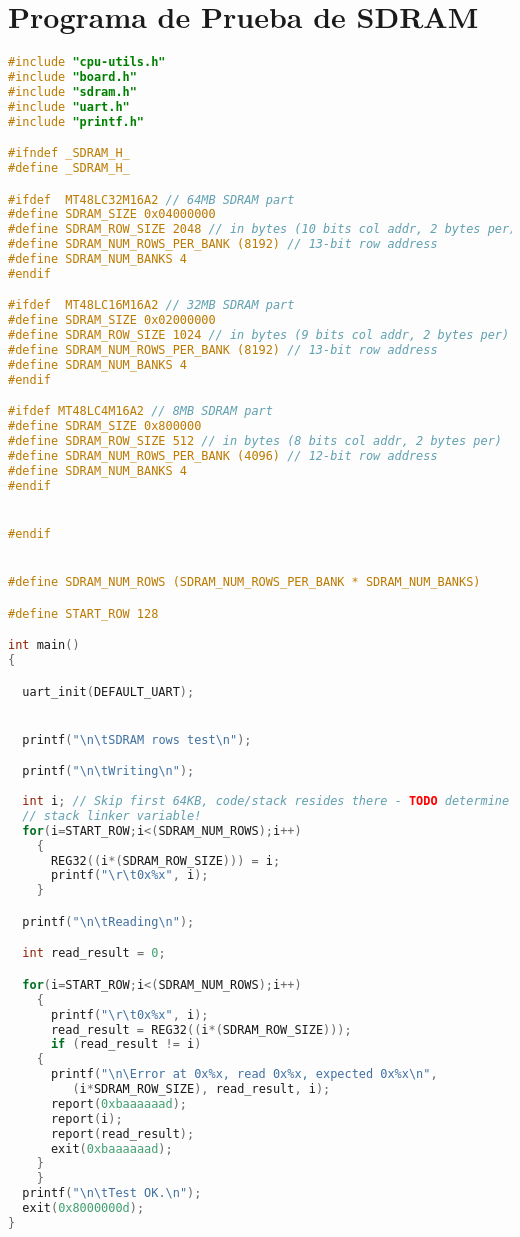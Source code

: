  \section{Programa de Prueba de SDRAM}
 \begin{lstlisting}[language=C,frame=single]
 #include "cpu-utils.h"
#include "board.h"
#include "sdram.h"
#include "uart.h"
#include "printf.h"

#ifndef _SDRAM_H_
#define _SDRAM_H_

#ifdef  MT48LC32M16A2 // 64MB SDRAM part
#define SDRAM_SIZE 0x04000000
#define SDRAM_ROW_SIZE 2048 // in bytes (10 bits col addr, 2 bytes per)
#define SDRAM_NUM_ROWS_PER_BANK (8192) // 13-bit row address
#define SDRAM_NUM_BANKS 4
#endif

#ifdef  MT48LC16M16A2 // 32MB SDRAM part
#define SDRAM_SIZE 0x02000000
#define SDRAM_ROW_SIZE 1024 // in bytes (9 bits col addr, 2 bytes per)
#define SDRAM_NUM_ROWS_PER_BANK (8192) // 13-bit row address
#define SDRAM_NUM_BANKS 4
#endif

#ifdef MT48LC4M16A2 // 8MB SDRAM part
#define SDRAM_SIZE 0x800000
#define SDRAM_ROW_SIZE 512 // in bytes (8 bits col addr, 2 bytes per)
#define SDRAM_NUM_ROWS_PER_BANK (4096) // 12-bit row address
#define SDRAM_NUM_BANKS 4
#endif


#endif


#define SDRAM_NUM_ROWS (SDRAM_NUM_ROWS_PER_BANK * SDRAM_NUM_BANKS)

#define START_ROW 128

int main()
{

  uart_init(DEFAULT_UART);


  printf("\n\tSDRAM rows test\n");

  printf("\n\tWriting\n");
  
  int i; // Skip first 64KB, code/stack resides there - TODO determine this from
  // stack linker variable!
  for(i=START_ROW;i<(SDRAM_NUM_ROWS);i++)
    {
      REG32((i*(SDRAM_ROW_SIZE))) = i;
      printf("\r\t0x%x", i);
    }

  printf("\n\tReading\n");

  int read_result = 0;

  for(i=START_ROW;i<(SDRAM_NUM_ROWS);i++)
    {
      printf("\r\t0x%x", i);
      read_result = REG32((i*(SDRAM_ROW_SIZE)));
      if (read_result != i)
	{
	  printf("\n\Error at 0x%x, read 0x%x, expected 0x%x\n",
		 (i*SDRAM_ROW_SIZE), read_result, i);
	  report(0xbaaaaaad);
	  report(i);
	  report(read_result);
	  exit(0xbaaaaaad);
	}
    }
  printf("\n\tTest OK.\n");
  exit(0x8000000d);  
}
 
 \end{lstlisting}

